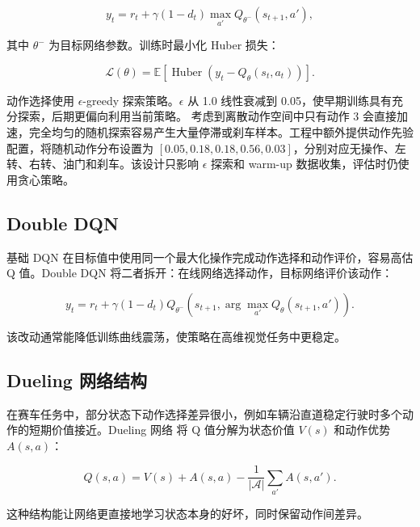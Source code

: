 \documentclass[UTF8,a4paper,12pt]{ctexart}
\begin{document}
\begin{equation}
y_t=r_t+\gamma(1-d_t)\max_{a'}Q_{\theta^-}(s_{t+1},a'),
\end{equation}

其中 $\theta^-$ 为目标网络参数。训练时最小化 Huber 损失：

\begin{equation}
\mathcal{L}(\theta)=\mathbb{E}\left[\operatorname{Huber}\left(y_t-Q_\theta(s_t,a_t)\right)\right].
\end{equation}

动作选择使用 $\epsilon$-greedy 探索策略。$\epsilon$ 从 1.0 线性衰减到 0.05，使早期训练具有充分探索，后期更偏向利用当前策略。
考虑到离散动作空间中只有动作 3 会直接加速，完全均匀的随机探索容易产生大量停滞或刹车样本。工程中额外提供动作先验配置，将随机动作分布设置为 $[0.05,0.18,0.18,0.56,0.03]$，分别对应无操作、左转、右转、油门和刹车。该设计只影响 $\epsilon$ 探索和 warm-up 数据收集，评估时仍使用贪心策略。

\subsection{Double DQN}

基础 DQN 在目标值中使用同一个最大化操作完成动作选择和动作评价，容易高估 Q 值。Double DQN \cite{hasselt2016double} 将二者拆开：在线网络选择动作，目标网络评价该动作：

\begin{equation}
y_t=r_t+\gamma(1-d_t)Q_{\theta^-}\left(s_{t+1},\arg\max_{a'}Q_\theta(s_{t+1},a')\right).
\end{equation}

该改动通常能降低训练曲线震荡，使策略在高维视觉任务中更稳定。

\subsection{Dueling 网络结构}

在赛车任务中，部分状态下动作选择差异很小，例如车辆沿直道稳定行驶时多个动作的短期价值接近。Dueling 网络 \cite{wang2016dueling} 将 Q 值分解为状态价值 $V(s)$ 和动作优势 $A(s,a)$：

\begin{equation}
Q(s,a)=V(s)+A(s,a)-\frac{1}{|\mathcal{A}|}\sum_{a'}A(s,a').
\end{equation}

这种结构能让网络更直接地学习状态本身的好坏，同时保留动作间差异。
\end{document}

